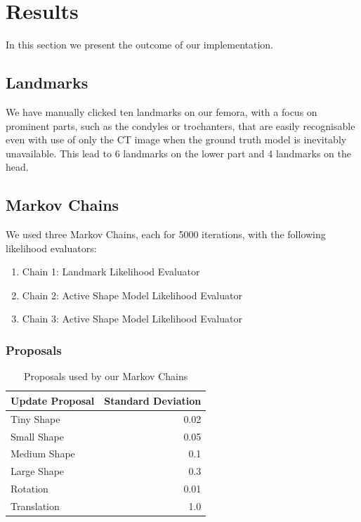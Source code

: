 \section{Results}
\label{sec:results}


In this section we present the outcome of our implementation.

\subsection{Landmarks}
\label{subsec:landmarks}

We have manually clicked ten landmarks on our femora, with a focus on prominent parts, such as the condyles or trochanters, that are easily recognisable even with use of only the CT image when the ground truth model is inevitably unavailable. This lead to 6 landmarks on the lower part and 4 landmarks on the head.


\subsection{Markov Chains}
\label{subsec:markovchains}
We used three Markov Chains, each for 5000 iterations, with the following likelihood evaluators:

\begin{enumerate}
	\item Chain 1: Landmark Likelihood Evaluator
	\item Chain 2: Active Shape Model Likelihood Evaluator
	\item Chain 3: Active Shape Model Likelihood Evaluator
\end{enumerate}


\subsubsection{Proposals}
\label{subsec:proposals}

\begin{table}
  \centering
  \caption{Proposals used by our Markov Chains}
  \label{tbl:proposals}
  \begin{tabular}{lr}
    \toprule
      \textbf{Update Proposal} &
      Standard Deviation \\
    \midrule
      Tiny Shape & 0.02 \\
      Small Shape & 0.05 \\
      Medium Shape & 0.1 \\
      Large Shape & 0.3 \\
      Rotation & 0.01 \\
      Translation & 1.0 \\
    \bottomrule
  \end{tabular}
\end{table}

